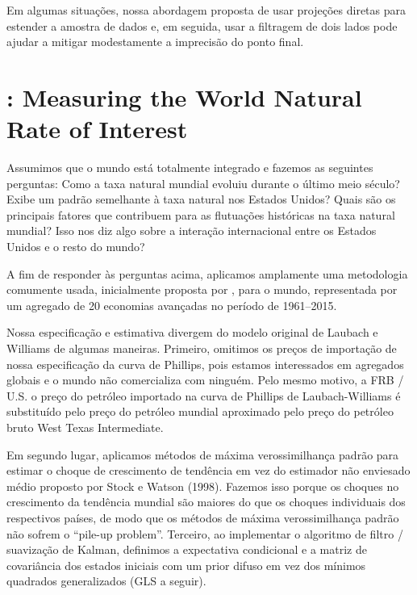 Em algumas situações, nossa abordagem proposta de usar projeções diretas para estender a amostra de dados e, em seguida, usar a filtragem de dois lados pode ajudar a mitigar modestamente a imprecisão do ponto final.
%
%
\section{\citet{Wynne:2018}: Measuring the World Natural Rate of Interest}
Assumimos que o mundo está totalmente integrado e fazemos as seguintes perguntas: Como a taxa natural mundial evoluiu durante o último meio século? Exibe um padrão semelhante à taxa natural nos Estados Unidos? Quais são os principais fatores que contribuem para as flutuações históricas na taxa natural mundial? Isso nos diz algo sobre a interação internacional entre os Estados Unidos e o resto do mundo?

A fim de responder às perguntas acima, aplicamos amplamente uma metodologia comumente usada, inicialmente proposta por \citet{LW:2003}, para o mundo, representada por um agregado de 20 economias avançadas no período de 1961–2015.

Nossa especificação e estimativa divergem do modelo original de Laubach e Williams de algumas maneiras. Primeiro, omitimos os preços de importação de nossa especificação da curva de Phillips, pois estamos interessados em agregados globais e o mundo não comercializa com ninguém. Pelo mesmo motivo, a FRB / U.S. o preço do petróleo importado na curva de Phillips de Laubach-Williams é substituído pelo preço do petróleo mundial aproximado pelo preço do petróleo bruto West Texas Intermediate. 

Em segundo lugar, aplicamos métodos de máxima verossimilhança padrão para estimar o choque de crescimento de tendência em vez do estimador não enviesado médio proposto por Stock e Watson (1998). Fazemos isso porque os choques no crescimento da tendência mundial são maiores do que os choques individuais dos respectivos países, de modo que os métodos de máxima verossimilhança padrão não sofrem o “pile-up problem”. Terceiro, ao implementar o algoritmo de filtro / suavização de Kalman, definimos a expectativa condicional e a matriz de covariância dos estados iniciais com um prior difuso em vez dos mínimos quadrados generalizados (GLS a seguir).

